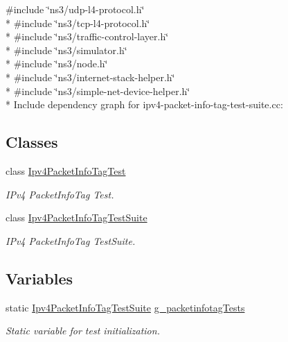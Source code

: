 {\ttfamily \#include \char`\"{}ns3/udp-\/l4-\/protocol.\+h\char`\"{}}\\*
{\ttfamily \#include \char`\"{}ns3/tcp-\/l4-\/protocol.\+h\char`\"{}}\\*
{\ttfamily \#include \char`\"{}ns3/traffic-\/control-\/layer.\+h\char`\"{}}\\*
{\ttfamily \#include \char`\"{}ns3/simulator.\+h\char`\"{}}\\*
{\ttfamily \#include \char`\"{}ns3/node.\+h\char`\"{}}\\*
{\ttfamily \#include \char`\"{}ns3/internet-\/stack-\/helper.\+h\char`\"{}}\\*
{\ttfamily \#include \char`\"{}ns3/simple-\/net-\/device-\/helper.\+h\char`\"{}}\\*
Include dependency graph for ipv4-\/packet-\/info-\/tag-\/test-\/suite.cc\+:
\subsection*{Classes}
\begin{DoxyCompactItemize}
\item 
class \hyperlink{classIpv4PacketInfoTagTest}{Ipv4\+Packet\+Info\+Tag\+Test}
\begin{DoxyCompactList}\small\item\em I\+Pv4 Packet\+Info\+Tag Test. \end{DoxyCompactList}\item 
class \hyperlink{classIpv4PacketInfoTagTestSuite}{Ipv4\+Packet\+Info\+Tag\+Test\+Suite}
\begin{DoxyCompactList}\small\item\em I\+Pv4 Packet\+Info\+Tag Test\+Suite. \end{DoxyCompactList}\end{DoxyCompactItemize}
\subsection*{Variables}
\begin{DoxyCompactItemize}
\item 
static \hyperlink{classIpv4PacketInfoTagTestSuite}{Ipv4\+Packet\+Info\+Tag\+Test\+Suite} \hyperlink{ipv4-packet-info-tag-test-suite_8cc_ac16b80f80675567700387cbe2f7f16f9}{g\+\_\+packetinfotag\+Tests}
\begin{DoxyCompactList}\small\item\em Static variable for test initialization. \end{DoxyCompactList}\end{DoxyCompactItemize}


